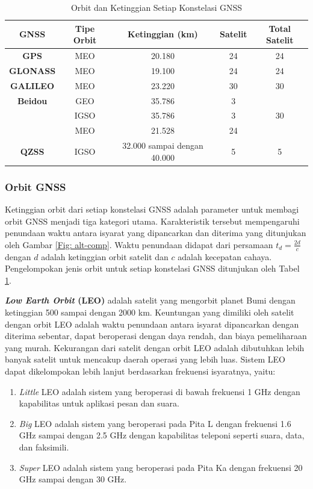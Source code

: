 \begin{table}[H]
	\caption{Orbit dan Ketinggian Setiap Konstelasi GNSS \cite{Li2019, Bury2019}}
	\vspace{0.5em}
	\centering
	\begin{tabular}{ccccc}
		\hline
		\textbf{GNSS} &\textbf{Tipe Orbit} & \textbf{Ketinggian (km)} & \textbf{Satelit} & \textbf{Total Satelit}\\
		\hline 
		\textbf{GPS} & MEO & 20.180 & 24 & 24\\
		\textbf{GLONASS} & MEO & 19.100 & 24 & 24\\
		\textbf{GALILEO} & MEO & 23.220 & 30 & 30\\
		\textbf{Beidou} & GEO & 35.786 & 3\\
		& IGSO & 35.786 & 3 & 30\\
		& MEO& 21.528 & 24\\
		\textbf{QZSS} & IGSO &32.000 sampai dengan 40.000 & 5 & 5\\
		\hline
	\end{tabular}
	\label{Tab: gnss-orbit}
\end{table}

\subsubsection{Orbit GNSS}
Ketinggian orbit dari setiap konstelasi GNSS adalah parameter untuk membagi orbit GNSS menjadi tiga kategori utama. Karakteristik tersebut mempengaruhi penundaan waktu antara isyarat yang dipancarkan dan diterima yang ditunjukan oleh Gambar \ref{Fig: alt-comp}. Waktu penundaan didapat dari persamaan $t_d = \frac{2d}{c}$ dengan $d$ adalah ketinggian orbit satelit dan $c$ adalah kecepatan cahaya. Pengelompokan jenis orbit untuk setiap konstelasi GNSS ditunjukan oleh Tabel \ref{Tab: gnss-orbit}.

\textbf{\textit{Low Earth Orbit} (LEO)} adalah satelit yang mengorbit planet Bumi dengan ketinggian 500 sampai dengan 2000 km. Keuntungan yang dimiliki oleh satelit dengan orbit LEO adalah waktu penundaan antara isyarat dipancarkan dengan diterima sebentar, dapat beroperasi dengan daya rendah, dan biaya pemeliharaan yang murah. Kekurangan dari satelit dengan orbit LEO adalah dibutuhkan lebih banyak satelit untuk mencakup daerah operasi yang lebih luas. Sistem LEO dapat dikelompokan lebih lanjut berdasarkan frekuensi isyaratnya, yaitu:

\begin{enumerate}
	\item \textit{Little} LEO adalah sistem yang beroperasi di bawah frekuensi 1 GHz dengan kapabilitas untuk aplikasi pesan dan suara.
	\item \textit{Big} LEO adalah sistem yang beroperasi pada Pita L dengan frekuensi 1.6 GHz sampai dengan 2.5 GHz dengan kapabilitas teleponi seperti suara, data, dan faksimili.
	\item \textit{Super} LEO adalah sistem yang beroperasi pada Pita Ka dengan frekuensi 20 GHz sampai dengan 30 GHz.
\end{enumerate}

